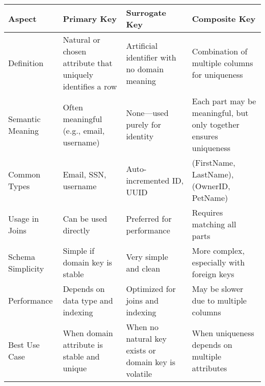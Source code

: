 \begin{NxLightBox}[title={Primary vs Surrogate vs Composite Keys}]
	\begin{tabularx}{\linewidth}{|l|X|X|X|}
		\hline
		\textbf{Aspect} & \textbf{Primary Key} & \textbf{Surrogate Key} & \textbf{Composite Key} \\
		\hline
		Definition & Natural or chosen attribute that uniquely identifies a row & Artificial identifier with no domain meaning & Combination of multiple columns for uniqueness \\
		\hline
		Semantic Meaning & Often meaningful (e.g., email, username) & None—used purely for identity & Each part may be meaningful, but only together ensures uniqueness \\
		\hline
		Common Types & Email, SSN, username & Auto-incremented ID, UUID & (FirstName, LastName), (OwnerID, PetName) \\
		\hline
		Usage in Joins & Can be used directly & Preferred for performance & Requires matching all parts \\
		\hline
		Schema Simplicity & Simple if domain key is stable & Very simple and clean & More complex, especially with foreign keys \\
		\hline
		Performance & Depends on data type and indexing & Optimized for joins and indexing & May be slower due to multiple columns \\
		\hline
		Best Use Case & When domain attribute is stable and unique & When no natural key exists or domain key is volatile & When uniqueness depends on multiple attributes \\
		\hline
	\end{tabularx}
\end{NxLightBox}

\begin{NxLightListBox}[title={Primary Key Principles}]
\end{NxLightListBox}

